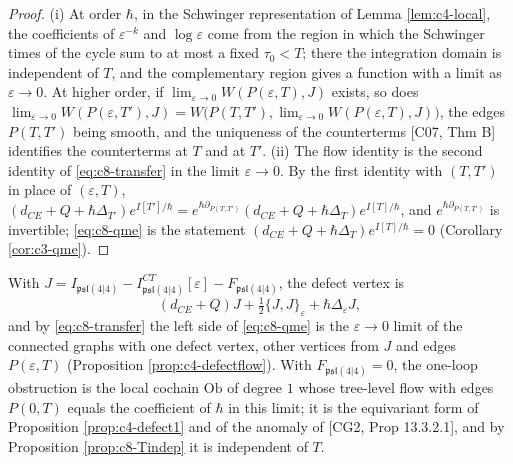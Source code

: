 \begin{proof}
(i) At order $\hbar$, in the Schwinger representation of Lemma \ref{lem:c4-local}, the coefficients of $\varepsilon^{-k}$ and $\log\varepsilon$ come from the region in which the Schwinger times of the cycle sum to at most a fixed $\tau_0<T$; there the integration domain is independent of $T$, and the complementary region gives a function with a limit as $\varepsilon\to0$. At higher order, if $\lim_{\varepsilon\to0}W(P(\varepsilon,T),J)$ exists, so does $\lim_{\varepsilon\to0}W(P(\varepsilon,T'),J)=W\big(P(T,T'),\lim_{\varepsilon\to0}W(P(\varepsilon,T),J)\big)$, the edges $P(T,T')$ being smooth, and the uniqueness of the counterterms [C07, Thm B] identifies the counterterms at $T$ and at $T'$. (ii) The flow identity is the second identity of \eqref{eq:c8-transfer} in the limit $\varepsilon\to0$. By the first identity with $(T,T')$ in place of $(\varepsilon,T)$, $(d_{CE}+Q+\hbar\Delta_{T'})e^{I[T']/\hbar}=e^{\hbar\partial_{P(T,T')}}(d_{CE}+Q+\hbar\Delta_T)e^{I[T]/\hbar}$, and $e^{\hbar\partial_{P(T,T')}}$ is invertible; \eqref{eq:c8-qme} is the statement $(d_{CE}+Q+\hbar\Delta_T)e^{I[T]/\hbar}=0$ (Corollary \ref{cor:c3-qme}).
\end{proof}

\begin{definition}
\label{def:c8-ob}
With $J=I_{\mathfrak{psl}(4|4)}-I^{CT}_{\mathfrak{psl}(4|4)}[\varepsilon]-F_{\mathfrak{psl}(4|4)}$, the defect vertex is
\[
(d_{CE}+Q)J+\tfrac12\{J,J\}_\varepsilon+\hbar\Delta_\varepsilon J ,
\]
and by \eqref{eq:c8-transfer} the left side of \eqref{eq:c8-qme} is the $\varepsilon\to0$ limit of the connected graphs with one defect vertex, other vertices from $J$ and edges $P(\varepsilon,T)$ (Proposition \ref{prop:c4-defectflow}). With $F_{\mathfrak{psl}(4|4)}=0$, the one-loop obstruction is the local cochain $\mathrm{Ob}$ of degree $1$ whose tree-level flow with edges $P(0,T)$ equals the coefficient of $\hbar$ in this limit; it is the equivariant form of Proposition \ref{prop:c4-defect1} and of the anomaly of [CG2, Prop 13.3.2.1], and by Proposition \ref{prop:c8-Tindep} it is independent of $T$.
\end{definition}

